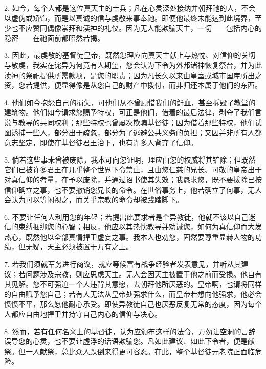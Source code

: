 2. 如今，每个人都是这位真天主的士兵；凡在心灵深处接纳并朝拜祂的人，不会以虚伪或矫饰，而是以真诚的信与虔敬来事奉祂。即便他最终未能达到此境界，至少也不应赞同偶像崇拜和渎神的礼仪。因为无人能欺骗天主，一切——包括内心的隐密——在祂面前都昭然若揭。\par

3. 因此，最虔敬的基督徒皇帝，既然您理应向真天主献上与热忱、对信仰的关切与敬虔，我实在诧异为何竟有人期望，您会认为下令为外邦诸神恢复祭台，并为此渎神的祭祀提供所需款项，是您的职责；因为凡长久以来由皇室或城市国库所出之资，您若提供，便显得像是从您自己的财产中拨付，而非归还本属于他们的东西。\par

4. 他们如今抱怨自己的损失，可他们从不曾顾惜我们的鲜血，甚至拆毁了教堂的建筑物。他们如今请求您赐予特权，可正是他们，借着的最后法律，剥夺了我们言说与教导的共同权利；那些特权也曾屡次欺骗基督徒；因为借着那些特权，他们试图诱捕一些人，部分出于疏忽，部分为了逃避公共义务的负担；又因并非所有人都意志坚定，即使在基督徒君王治下，也有许多人背弃了信仰。\par

5. 倘若这些事未曾被废除，我本可向您证明，理应由您的权威将其铲除；但既然它们已被许多君王在几乎整个世界下令禁止，且由您仁慈的兄长、可敬的皇帝出于对真信仰的考量，在予以废除，并通过诏书使其失效；我恳求您，既不要拔除已按信仰确立之事，也不要撤销您兄长的命令。在世俗事务上，他若确立了何事，无人会认为可以等闲视之，而关乎宗教的命令却被践踏脚下。\par

6. 不要让任何人利用您的年轻；若提出此要求者是个异教徒，他就不该以自己迷信的束缚捆绑您的心智；相反，他应以其热忱教导并劝诫您，如何为真信仰而大发热心，既然他以全部真情捍卫虚妄之事。我本人也劝您，固然要尊重显赫人物的功绩，但无疑，天主必须被置于万有之上。\par

7. 若我们须就军务进行商议，就应等候富有战争经验者发表意见，并听从其建议；若问题涉及宗教，则应思虑天主。无人会因天主被置于他之前而受损。他自有其见解。您不可强迫一个人违背其意愿，去朝拜他所厌恶的。皇帝啊，也请将同样的自由赋予您自己；若有人无法从皇帝处强求什么，而皇帝若想向他强求，他必会愤愤不平，那么愿他耐心承受。即使异教徒自己也厌恶反复无常的态度，因为每个人都应自由地捍卫并持守自己内心的信仰与决心。\par

8. 然而，若有任何名义上的基督徒，认为应颁布这样的法令，万勿让空洞的言辞误导您的心灵，也不要让虚浮的话语欺骗您。凡如此建议、如此下令者，便是献祭。但一人献祭，总比众人跌倒来得更可容忍。在此，整个基督徒元老院正面临危险。\par

